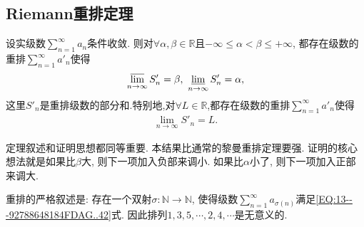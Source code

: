 \documentclass[../../main.tex]{subfiles}
\begin{document}
\subsection{Riemann重排定理}

\begin{theorem}[Riemann重排定理]\label{theorem:Riemann重排定理}
设实级数$\sum\limits_{n=1}^{\infty}a_n$条件收敛. 则对$\forall \alpha,\beta\in \mathbb{R}$且$-\infty\leqslant\alpha<\beta\leqslant+\infty$, 都存在级数的重排$\sum\limits_{n=1}^{\infty}a'_n$使得
\begin{align}\label{EQ:13---92788648184FDAG..42}
\varlimsup_{n\to\infty}S'_n=\beta,\ \varliminf_{n\to\infty}S'_n=\alpha,
\end{align}
这里$S'_n$是重排级数的部分和.特别地,对$\forall L\in\mathbb{R}$,都存在级数的重排$\sum\limits_{n=1}^{\infty}a'_n$使得
\begin{align*}
\underset{n\rightarrow \infty}{\lim}S'_n=L.
\end{align*}
\end{theorem}
\begin{note}
定理叙述和证明思想都同等重要. 本结果比通常的黎曼重排定理要强. 证明的核心想法就是如果比$\beta$大, 则下一项加入负部来调小. 如果比$\alpha$小了, 则下一项加入正部来调大.
\end{note}
\begin{remark}
重排的严格叙述是: 存在一个双射$\sigma:\mathbb{N}\to\mathbb{N}$, 使得级数$\sum\limits_{n=1}^{\infty}a_{\sigma(n)}$满足\eqref{EQ:13---92788648184FDAG..42}式.
因此排列$1,3,5,\cdots,2,4,\cdots$是无意义的.
\end{remark}
\end{document}
